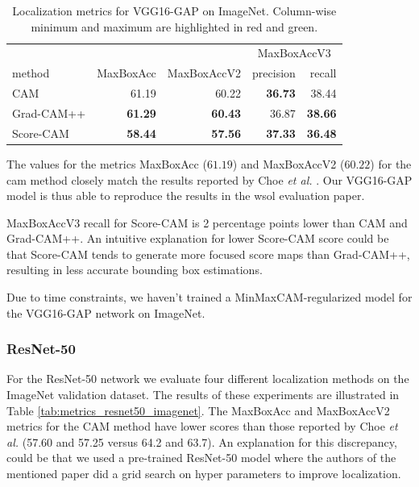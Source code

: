 \begin{table}[ht]
\centering
\begin{tabular}{lrrrr}
\toprule
 & & & \multicolumn{2}{c}{MaxBoxAccV3} \\
method & MaxBoxAcc & MaxBoxAccV2 & precision & recall \\
\cmidrule(lr){1-1} \cmidrule(lr){2-5}
CAM & 61.19 & 60.22 & \color{purple} \bfseries 36.73 & 38.44 \\
Grad-CAM++ & \color{teal} \bfseries 61.29 & \color{teal} \bfseries 60.43 & 36.87 & \color{teal} \bfseries 38.66 \\
Score-CAM & \color{purple} \bfseries 58.44 & \color{purple} \bfseries 57.56 & \color{teal} \bfseries 37.33 & \color{purple} \bfseries 36.48 \\
\bottomrule
\end{tabular}
\caption[Localization metrics for VGG16-GAP on ImageNet]{Localization metrics for VGG16-GAP on ImageNet. Column-wise minimum and maximum are highlighted in red and green.}
\label{tab:metrics_vgg16_gap_imagenet}
\end{table}

The values for the metrics MaxBoxAcc ($61.19$) and MaxBoxAccV2 ($60.22$) for the \acrshort{cam} method closely match the results reported by Choe \textit{et al.} \cite{choe2020evaluating}. Our VGG16-GAP model is thus able to reproduce the results in the \acrshort{wsol} evaluation paper.

MaxBoxAccV3 recall for Score-CAM is 2 percentage points lower than CAM and Grad-CAM++. An intuitive explanation for lower Score-CAM score could be that Score-CAM tends to generate more focused score maps than Grad-CAM++, resulting in less accurate bounding box estimations. 

Due to time constraints, we haven't trained a MinMaxCAM-regularized model for the VGG16-GAP network on ImageNet.

\subsubsection{ResNet-50}

For the ResNet-50 network we evaluate four different localization methods on the ImageNet validation dataset. The results of these experiments are illustrated in Table \ref{tab:metrics_resnet50_imagenet}. The MaxBoxAcc and MaxBoxAccV2 metrics for the CAM method have lower scores than those reported by Choe \textit{et al.} (57.60 and 57.25 versus 64.2 and 63.7). An explanation for this discrepancy, could be that we used a pre-trained ResNet-50 model where the authors of the mentioned paper did a grid search on hyper parameters to improve localization. 

